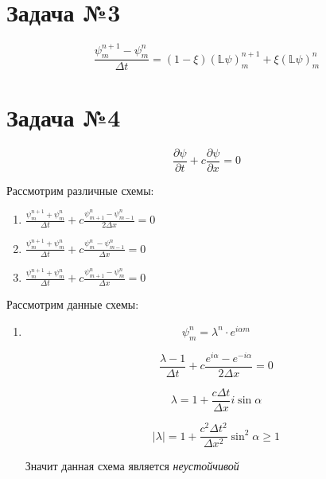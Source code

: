 \documentclass[10pt,a4paper]{article}
\begin{document}
	\section{Задача №3}
	
	\begin{equation}
		\frac{\psi_{m}^{n + 1} - \psi_{m}^{n}}{\Delta t} = \left(1 - \xi\right)
		\left(\mathbb{L}\psi\right)^{n + 1}_{m} + \xi\left(\mathbb{L}\psi
		\right)^{n}_{m}
	\end{equation}
	
	\section{Задача №4}
	
	\begin{equation}
		\frac{\partial \psi }{\partial t} + c\frac{\partial \psi}{\partial x}=0
	\end{equation}
	
	Рассмотрим различные схемы:
	
	\begin{enumerate}
		\item $
			\frac{\psi^{n + 1}_{m} + \psi_{m}^{n}}{\Delta t} + 
			c\frac{\psi_{m + 1}^{n} - \psi_{m - 1}^{n}}{2\Delta x} = 0
		$
		\item $
			\frac{\psi^{n + 1}_{m} + \psi_{m}^{n}}{\Delta t} + 
			c\frac{\psi_{m}^{n} - \psi_{m - 1}^{n}}{\Delta x} = 0
		$
		\item $
			\frac{\psi^{n + 1}_{m} + \psi_{m}^{n}}{\Delta t} + 
			c\frac{\psi_{m + 1}^{n} - \psi_{m}^{n}}{\Delta x} = 0
		$
		
	\end{enumerate}


	Рассмотрим данные схемы:
	
	\begin{enumerate}
		\item \begin{equation}
			\psi^{n}_{m} = \lambda^{n}\cdot e^{i\alpha m}
		\end{equation}
		
		\begin{equation}
			\frac{\lambda - 1}{\Delta t} + c\frac{e^{i\alpha} - e^{-i\alpha}}
			{2\Delta x} = 0
		\end{equation}
		
		\begin{equation}
			\lambda = 1 + \frac{c\Delta t}{\Delta x}i\sin\alpha
		\end{equation}
		
		\begin{equation}
			\left|\lambda\right| = 1 + \frac{c^{2}\Delta t^{2}}{\Delta x^{2}}
			\sin^{2}\alpha \geqslant 1
		\end{equation}
		
		Значит данная схема является \textit{неустойчивой}
	\end{enumerate}
\end{document}
